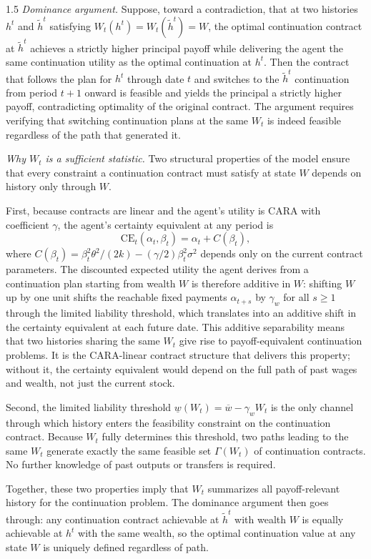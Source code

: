 \documentclass[12pt]{article}
\theoremstyle{definition}
\theoremstyle{plain}
\begin{document}
\begin{spacing}{1.5}
\textit{Dominance argument.} Suppose, toward a contradiction, that at two histories $h^t$ and $\tilde{h}^t$ satisfying $W_t(h^t) = W_t(\tilde{h}^t) = W$, the optimal continuation contract at $\tilde{h}^t$ achieves a strictly higher principal payoff while delivering the agent the same continuation utility as the optimal continuation at $h^t$. Then the contract that follows the plan for $h^t$ through date $t$ and switches to the $\tilde{h}^t$ continuation from period $t+1$ onward is feasible and yields the principal a strictly higher payoff, contradicting optimality of the original contract. The argument requires verifying that switching continuation plans at the same $W_t$ is indeed feasible regardless of the path that generated it.

\textit{Why $W_t$ is a sufficient statistic.} Two structural properties of the model ensure that every constraint a continuation contract must satisfy at state $W$ depends on history only through $W$.

First, because contracts are linear and the agent's utility is CARA with coefficient $\gamma$, the agent's certainty equivalent at any period is
\[
\mathrm{CE}_t(\alpha_t, \beta_t) = \alpha_t + C(\beta_t),
\]
where $C(\beta_t) = \beta_t^2\theta^2/(2k) - (\gamma/2)\beta_t^2\sigma^2$ depends only on the current contract parameters. The discounted expected utility the agent derives from a continuation plan starting from wealth $W$ is therefore additive in $W$: shifting $W$ up by one unit shifts the reachable fixed payments $\alpha_{t+s}$ by $\gamma_w$ for all $s \geq 1$ through the limited liability threshold, which translates into an additive shift in the certainty equivalent at each future date. This additive separability means that two histories sharing the same $W_t$ give rise to payoff-equivalent continuation problems. It is the CARA-linear contract structure that delivers this property; without it, the certainty equivalent would depend on the full path of past wages and wealth, not just the current stock.

Second, the limited liability threshold $\underline{w}(W_t) = \overline{w} - \gamma_w W_t$ is the only channel through which history enters the feasibility constraint on the continuation contract. Because $W_t$ fully determines this threshold, two paths leading to the same $W_t$ generate exactly the same feasible set $\Gamma(W_t)$ of continuation contracts. No further knowledge of past outputs or transfers is required.

Together, these two properties imply that $W_t$ summarizes all payoff-relevant history for the continuation problem. The dominance argument then goes through: any continuation contract achievable at $\tilde{h}^t$ with wealth $W$ is equally achievable at $h^t$ with the same wealth, so the optimal continuation value at any state $W$ is uniquely defined regardless of path.


\end{spacing}
\end{document}
